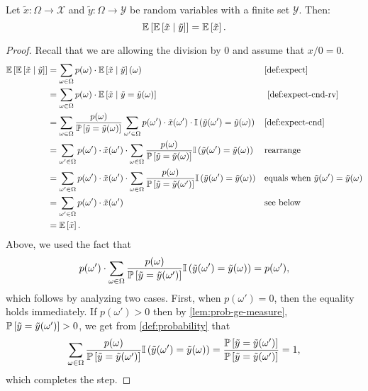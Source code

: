 \begin{theorem} \label{thm:total_expectation}
Let $\tilde{x} \colon \Omega \to \mathcal{X}$ and $\tilde{y} \colon \Omega \to \mathcal{Y}$ be random variables with a finite set $\mathcal{Y}$. Then:
\[
\mathbb{E}\left[\mathbb{E}\left[\tilde{x} \mid  \tilde{y}\right]\right] = \mathbb{E} \left[ \tilde{x} \right].
\]
\end{theorem}
\begin{proof}
Recall that we are allowing the division by 0 and assume that $x / 0 = 0$.
\begin{align*} 
  \E\left[\E\left[\tilde{x} \mid  \tilde{y}\right]\right]
  &= \sum_{\omega \in \Omega }  p (\omega) \cdot  \E \left[ \tilde{x} \mid  \tilde{y} \right](\omega) && \text{\cref{def:expect}}\\
  &= \sum_{\omega \in \Omega }  p (\omega) \cdot  \E \left[ \tilde{x} \mid  \tilde{y}  = \tilde{y}(\omega) \right] && \text{~\cref{def:expect-cnd-rv}}\\
  &= \sum_{\omega \in \Omega }  \frac{p(\omega)}{\PP \left[ \tilde{y}= \tilde{y}(\omega)\right]} \sum_{\omega'\in \Omega } p(\omega') \cdot \tilde{x}(\omega') \cdot  \I\left( \tilde{y}(\omega') = \tilde{y}(\omega) \right)   && \text{\cref{def:expect-cnd}} \\
  &=  \sum_{\omega'\in \Omega } p(\omega') \cdot \tilde{x}(\omega') \cdot \sum_{\omega \in \Omega }  \frac{p(\omega)}{\PP \left[ \tilde{y}= \tilde{y}(\omega)\right]} \I\left( \tilde{y}(\omega') = \tilde{y}(\omega) \right)  && \text{rearrange} \\
  &=  \sum_{\omega'\in \Omega } p(\omega') \cdot \tilde{x}(\omega') \cdot \sum_{\omega \in \Omega }  \frac{p(\omega)}{\PP \left[ \tilde{y} = \tilde{y}(\omega')\right]} \I\left( \tilde{y}(\omega') = \tilde{y}(\omega) \right)  && \text{equals when } \tilde{y}(\omega') = \tilde{y}(\omega) \\
  &=  \sum_{\omega'\in \Omega } p(\omega') \cdot \tilde{x}(\omega')    && \text{see below}  \\
  &= \E \left[ \tilde{x} \right].
\end{align*}
Above, we used the fact that
\[
  p(\omega') \cdot \sum_{\omega \in \Omega }  \frac{p(\omega)}{\mathbb{P} \left[ \tilde{y} = \tilde{y}(\omega')\right]} \mathbb{I}\left( \tilde{y}(\omega') = \tilde{y}(\omega) \right) =  p(\omega'),  
\]
which follows by analyzing two cases. First, when $p(\omega') = 0$, then the equality holds immediately. If $p(\omega') > 0$ then by \cref{lem:prob-ge-measure}, $\mathbb{P} \left[ \tilde{y} = \tilde{y}(\omega')\right] > 0$, we get from \cref{def:probability} that
\[
  \sum_{\omega \in \Omega } \frac{p(\omega)}{\mathbb{P} \left[ \tilde{y} = \tilde{y}(\omega')\right]} \mathbb{I}\left( \tilde{y}(\omega') = \tilde{y}(\omega) \right) 
    =
    \frac{\mathbb{P} \left[ \tilde{y} = \tilde{y}(\omega')\right]}{\mathbb{P} \left[ \tilde{y} = \tilde{y}(\omega')\right]}
    = 1,
  \]
  which completes the step.
\end{proof}
